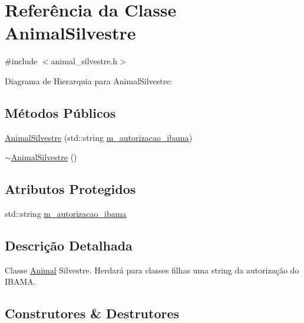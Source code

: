 \hypertarget{classAnimalSilvestre}{}\section{Referência da Classe Animal\+Silvestre}
\label{classAnimalSilvestre}


{\ttfamily \#include $<$animal\+\_\+silvestre.\+h$>$}



Diagrama de Hierarquia para Animal\+Silvestre\+:
\subsection*{Métodos Públicos}
\begin{DoxyCompactItemize}
\item 
\hyperlink{classAnimalSilvestre_a974a66228df384dddbb073e7589a7068}{Animal\+Silvestre} (std\+::string \hyperlink{classAnimalSilvestre_a921c430fa2507062e3a2605599dd6735}{m\+\_\+autorizacao\+\_\+ibama})
\item 
\hyperlink{classAnimalSilvestre_a3c7b842e393cda436f252c4eb6021aaa}{$\sim$\+Animal\+Silvestre} ()
\end{DoxyCompactItemize}
\subsection*{Atributos Protegidos}
\begin{DoxyCompactItemize}
\item 
std\+::string \hyperlink{classAnimalSilvestre_a921c430fa2507062e3a2605599dd6735}{m\+\_\+autorizacao\+\_\+ibama}
\end{DoxyCompactItemize}


\subsection{Descrição Detalhada}
Classe \hyperlink{classAnimal}{Animal} Silvestre. Herdará para classes filhas uma string da autorização do I\+B\+A\+MA. 

\subsection{Construtores \& Destrutores}
\mbox{\label{classAnimalSilvestre_a974a66228df384dddbb073e7589a7068}} 
